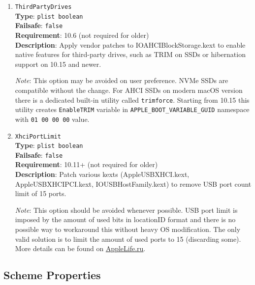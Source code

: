 \documentclass[]{article}
\makeatletter
\renewcommand{\label}[1]{%
\zref@wrapper@immediate{\oldlabel{#1}}}  %
\makeatother
\begin{document}
\begin{enumerate}
  \emph{Note 3}: Trim operations are \emph{only} affected at booting phase when the startup volume is mounted.
  Either specifying timeout, or completely disabling trim with \texttt{0}, will not affect normal macOS running.

\item
  \texttt{ThirdPartyDrives}\\
  \textbf{Type}: \texttt{plist\ boolean}\\
  \textbf{Failsafe}: \texttt{false}\\
  \textbf{Requirement}: 10.6 (not required for older)\\
  \textbf{Description}: Apply vendor patches to IOAHCIBlockStorage.kext to enable
  native features for third-party drives, such as TRIM on SSDs or hibernation
  support on 10.15 and newer.

  \emph{Note}: This option may be avoided on user preference. NVMe SSDs are
  compatible without the change. For AHCI SSDs on modern macOS version there
  is a dedicated built-in utility called \texttt{trimforce}. Starting from 10.15
  this utility creates \texttt{EnableTRIM} variable in \texttt{APPLE\_BOOT\_VARIABLE\_GUID}
  namespace with \texttt{01 00 00 00} value.

\item
  \texttt{XhciPortLimit}\\
  \textbf{Type}: \texttt{plist\ boolean}\\
  \textbf{Failsafe}: \texttt{false}\\
  \textbf{Requirement}: 10.11+ (not required for older)\\
  \textbf{Description}: Patch various kexts (AppleUSBXHCI.kext, AppleUSBXHCIPCI.kext,
  IOUSBHostFamily.kext) to remove USB port count limit of 15 ports.

  \emph{Note}: This option should be avoided whenever possible. USB port limit
  is imposed by the amount of used bits in locationID format and there is no
  possible way to workaround this without heavy OS modification. The only
  valid solution is to limit the amount of used ports to 15 (discarding some).
  More details can be found on \href{https://applelife.ru/posts/550233}{AppleLife.ru}.

\end{enumerate}

\subsection{Scheme Properties}\label{kernelpropsscheme}
\end{document}
